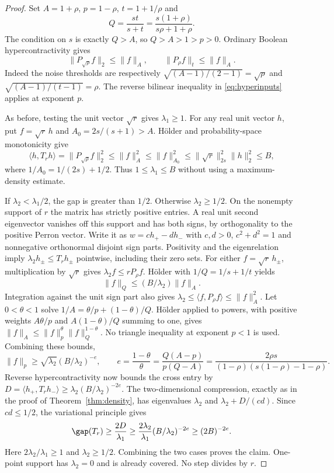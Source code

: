 \begin{proof}
Set $A=1+\rho$, $p=1-\rho$, $t=1+1/\rho$ and
\[
 Q=\frac{st}{s+t}=\frac{s(1+\rho)}{s\rho+1+\rho}.
\]
The condition on $s$ is exactly $Q>A$, so $Q>A>1>p>0$.
Ordinary Boolean hypercontractivity gives
\[
 \|P_{\sqrt\rho}f\|_2\le\|f\|_A,
 \qquad \|P_\rho f\|_t\le\|f\|_A.
\]
Indeed the noise thresholds are respectively
$\sqrt{(A-1)/(2-1)}=\sqrt\rho$ and
$\sqrt{(A-1)/(t-1)}=\rho$. The reverse bilinear inequality in
\eqref{eq:hyperinputs} applies at exponent $p$.

As before, testing the unit vector $\sqrt r$ gives $\lambda_1\ge1$.
For any real unit vector $h$, put $f=\sqrt r\,h$ and
$A_0=2s/(s+1)>A$. H\"older and probability-space monotonicity give
\[
 \langle h,T_rh\rangle=\|P_{\sqrt\rho}f\|_2^2
 \le\|f\|_A^2\le\|f\|_{A_0}^2
 \le\|\sqrt r\|_{2s}^2\|h\|_2^2\le B,
\]
where $1/A_0=1/(2s)+1/2$. Thus $1\le\lambda_1\le B$ without
using a maximum-density estimate.

If $\lambda_2<\lambda_1/2$, the gap is greater than $1/2$.
Otherwise $\lambda_2\ge1/2$. On the nonempty support of $r$ the matrix
has strictly positive entries. A real unit second eigenvector vanishes
off this support and has both signs, by orthogonality to the positive
Perron vector. Write it as $w=c h_+-d h_-$ with $c,d>0$,
$c^2+d^2=1$ and nonnegative orthonormal disjoint sign parts.
Positivity and the eigenrelation imply
$\lambda_2h_\pm\le T_rh_\pm$ pointwise, including their zero sets.
For either $f=\sqrt r\,h_\pm$, multiplication by $\sqrt r$ gives
$\lambda_2f\le rP_\rho f$. H\"older with $1/Q=1/s+1/t$ yields
\[
 \|f\|_Q\le (B/\lambda_2)\|f\|_A.
\]
Integration against the unit sign part also gives
$\lambda_2\le\langle f,P_\rho f\rangle\le\|f\|_A^2$.
Let $0<\theta<1$ solve $1/A=\theta/p+(1-\theta)/Q$.
H\"older applied to powers, with positive weights
$A\theta/p$ and $A(1-\theta)/Q$ summing to one, gives
$\|f\|_A\le\|f\|_p^\theta\|f\|_Q^{1-\theta}$.
No triangle inequality at exponent $p<1$ is used. Combining these bounds,
\[
 \|f\|_p\ge\sqrt{\lambda_2}(B/\lambda_2)^{-e},\qquad
 e=\frac{1-\theta}{\theta}
   =\frac{Q(A-p)}{p(Q-A)}
   =\frac{2\rho s}{(1-\rho)(s(1-\rho)-1-\rho)}.
\]
Reverse hypercontractivity now bounds the cross entry by
$D=\langle h_+,T_rh_-\rangle\ge\lambda_2(B/\lambda_2)^{-2e}$.
The two-dimensional compression, exactly as in the proof of
Theorem~\ref{thm:density}, has eigenvalues $\lambda_2$ and
$\lambda_2+D/(cd)$. Since $cd\le1/2$, the variational principle gives
\[
 \gap(T_r)\ge\frac{2D}{\lambda_1}
 \ge\frac{2\lambda_2}{\lambda_1}(B/\lambda_2)^{-2e}
 \ge(2B)^{-2e}.
\]
Here $2\lambda_2/\lambda_1\ge1$ and $\lambda_2\ge1/2$.
Combining the two cases proves the claim. One-point support has
$\lambda_2=0$ and is already covered. No step divides by $r$.
\end{proof}

